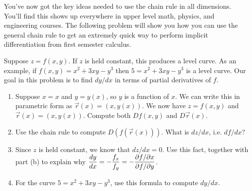 You've now got the key ideas needed to use the chain rule in all dimensions. You'll find this shows up everywhere in upper level math, physics, and engineering courses. The following problem will show you how you can use the general chain rule to get an extremely quick way to perform implicit differentiation from first semester calculus.

\begin{problem}%
 Suppose $z=f(x,y)$.  If $z$ is held constant, this produces a level curve. As an example, if $f(x,y) = x^2+3xy-y^3$ then $5=x^2+3xy-y^3$ is a level curve. Our goal in this problem is to find $dy/dx$ in terms of partial derivatives of $f$.
\begin{enumerate}
 \item Suppose $x=x$ and $y=y(x)$, so $y$ is a function of $x$.  We can write this in parametric form as $\vec r(x) = (x,y(x))$. We now have $z=f(x,y)$ and $\vec r(x)=(x,y(x))$.  Compute both $Df(x,y)$ and $D\vec r(x)$. 
 \item Use the chain rule to compute $D(f(\vec r(x)))$. What is $dz/dx$, i.e. $df/dx$?
 \item Since $z$ is held constant, we know that $dz/dx=0$. Use this fact, together with part (b) to explain why $\displaystyle \frac{dy}{dx} = -\frac{f_x}{f_y} = -\frac{\partial f/ \partial x}{\partial f/ \partial y}$.
 \item For the curve $5=x^2+3xy-y^3$, use this formula to compute $dy/dx$.
\end{enumerate}
  
\end{problem}



